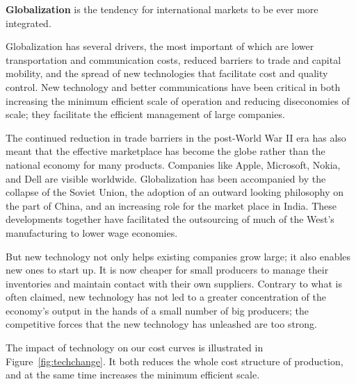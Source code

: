 \begin{DefBox}
\textbf{Globalization} is the tendency for international markets to be ever more integrated.
\end{DefBox}

Globalization has several drivers, the most important of which are lower transportation and communication costs, reduced barriers to trade and capital mobility, and the spread of new technologies that facilitate cost and quality control. New technology and better communications have been critical in both increasing the minimum efficient scale of operation and reducing diseconomies of scale; they facilitate the efficient management of large companies.

The continued reduction in trade barriers in the post-World War II era has also meant that the effective marketplace has become the globe rather than the national economy for many products. Companies like Apple, Microsoft, Nokia, and Dell are visible worldwide.  Globalization has been accompanied by the collapse of the Soviet Union, the adoption of an outward looking philosophy on the part of China, and an increasing role for the market place in India. These developments together have facilitated the outsourcing of much of the West's manufacturing to lower wage economies.

But new technology not only helps existing companies grow large; it also enables new ones to start up. It is now cheaper for small producers to manage their inventories and maintain contact with their own suppliers. Contrary to what is often claimed, new technology has not led to a greater concentration of the economy's output in the hands of a small number of big producers; the competitive forces that the new technology has unleashed are too strong.

The impact of technology on our cost curves is illustrated in Figure~\ref{fig:techchange}. It both reduces the whole cost structure of production, and at the same time increases the minimum efficient scale.

